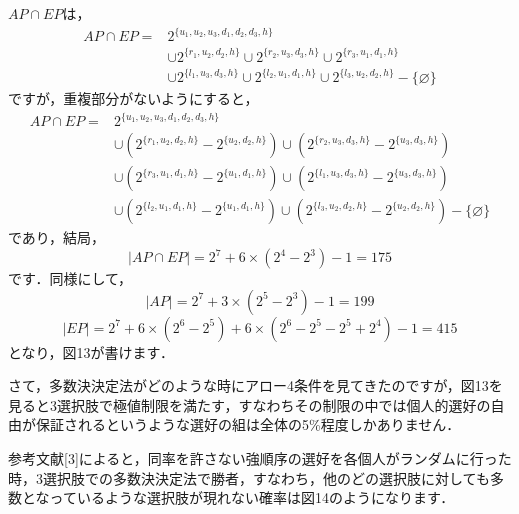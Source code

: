 $AP \cap EP$は，
\begin{align*}
    AP \cap EP = &
        2^{\{u_1,u_2,u_3,d_1,d_2,d_3,h\}} \\
      & \cup 2^{\{r_1,u_2,d_2,h\}} 
        \cup 2^{\{r_2,u_3,d_3,h\}} 
        \cup 2^{\{r_3,u_1,d_1,h\}} \\ 
      & \cup 2^{\{l_1,u_3,d_3,h\}} 
        \cup 2^{\{l_2,u_1,d_1,h\}} 
        \cup 2^{\{l_3,u_2,d_2,h\}} - \{\varnothing\}
\end{align*}
ですが，重複部分がないようにすると，
\begin{align*}
    AP \cap EP = &
        2^{\{u_1,u_2,u_3,d_1,d_2,d_3,h\}} \\
      & \cup (2^{\{r_1,u_2,d_2,h\}} - 2^{\{u_2,d_2,h\}})
        \cup (2^{\{r_2,u_3,d_3,h\}} - 2^{\{u_3,d_3,h\}}) \\
      & \cup (2^{\{r_3,u_1,d_1,h\}} - 2^{\{u_1,d_1,h\}})  
        \cup (2^{\{l_1,u_3,d_3,h\}} - 2^{\{u_3,d_3,h\}}) \\
      & \cup (2^{\{l_2,u_1,d_1,h\}} - 2^{\{u_1,d_1,h\}}) 
        \cup (2^{\{l_3,u_2,d_2,h\}} - 2^{\{u_2,d_2,h\}}) - \{\varnothing\}
\end{align*}
であり，結局，
\begin{equation*}
    |AP \cap EP| = 2^7 + 6 \times (2^4 - 2^3) - 1 = 175 
\end{equation*}
です．同様にして，
\begin{equation*}
    |AP| = 2^7 + 3 \times (2^5 - 2^3) - 1 = 199
\end{equation*}
\begin{equation*}
    |EP| = 2^7 + 6 \times (2^6 - 2^5) + 6 \times (2^6 - 2^5 - 2^5 + 2^4) - 1 = 415
\end{equation*}
となり，図13が書けます．

さて，多数決決定法がどのような時にアロー4条件を見てきたのですが，図13を見ると3選択肢で極値制限を満たす，すなわちその制限の中では個人的選好の自由が保証されるというような選好の組は全体の5\%程度しかありません．

参考文献[3]によると，同率を許さない強順序の選好を各個人がランダムに行った時，3選択肢での多数決決定法で勝者，すなわち，他のどの選択肢に対しても多数となっているような選択肢が現れない確率は図14のようになります．


